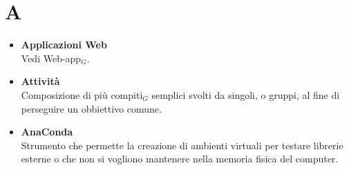 \chapter{A} \label{A}
\begin{itemize}
		\item \textbf{Applicazioni Web}\\
		Vedi Web-app$_G$.
		\item \textbf{Attività}\\
		Composizione di più compiti$_G$ semplici svolti da singoli, o gruppi, al fine di perseguire un obbiettivo comune.
		
		\item \textbf{AnaConda}\\
		Strumento che permette la creazione di ambienti virtuali per testare librerie esterne o che non si vogliono mantenere nella memoria fisica del computer.
	\end{itemize}

